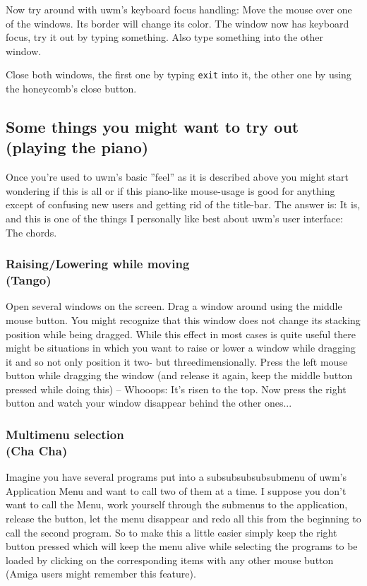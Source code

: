 \documentclass[10pt,a4paper]{article}
\begin{document}
Now try around with uwm's keyboard focus handling: Move the mouse over one of the windows. Its border will change its color. The window now has keyboard focus, try it out by typing something. Also type something into the other window.

Close both windows, the first one by typing \texttt{exit} into it, the other one by using the honeycomb's close button.

\subsection{Some things you might want to try out\\
\normalsize(playing the piano)}
Once you're used to uwm's basic ''feel'' as it is described above you might start wondering if this is all or if this piano-like mouse-usage is good for anything except of confusing new users and getting rid of the title-bar. The answer is: It is, and this is one of the things I personally like best about uwm's user interface: The chords.

\subsubsection{Raising/Lowering while moving\\\rm(Tango)}

Open several windows on the screen. Drag a window around using the middle mouse button. You might recognize that this window does not change its stacking position while being dragged. While this effect in most cases is quite useful there might be situations in which you want to raise or lower a window while dragging it and so not only position it two- but threedimensionally.
Press the left mouse button while dragging the window (and release it again, keep the middle button pressed while doing this) -- Whooops: It's risen to the top. Now press the right button and watch your window disappear behind the other ones...

\subsubsection{Multimenu selection\\\rm(Cha Cha)}
Imagine you have several programs put into a subsubsubsubsubmenu of uwm's \textsf{Application Menu} and want to call two of them at a time. I suppose you don't want to call the Menu, work yourself through the submenus to the application, release the button, let the menu disappear and redo all this from the beginning to call the second program. So to make this a little easier simply keep the right button pressed which will keep the menu alive while selecting the programs to be loaded by clicking on the corresponding items with any other mouse button (Amiga users might remember this feature).
\end{document}
